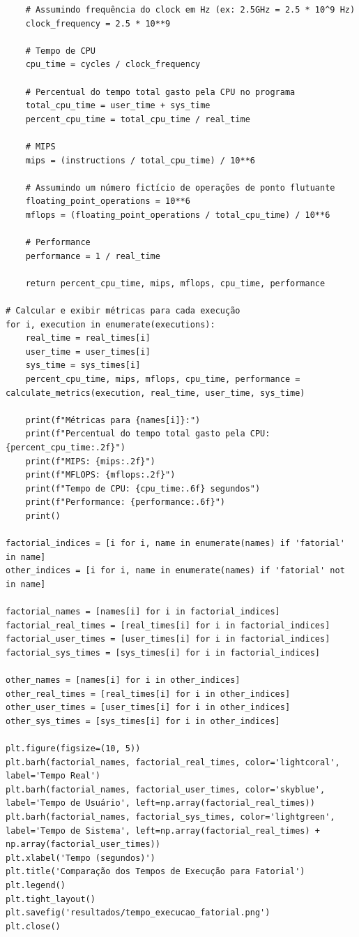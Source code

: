 \documentclass[12pt]{article}
\begin{document}
\begin{verbatim}
    # Assumindo frequência do clock em Hz (ex: 2.5GHz = 2.5 * 10^9 Hz)
    clock_frequency = 2.5 * 10**9 
    
    # Tempo de CPU
    cpu_time = cycles / clock_frequency

    # Percentual do tempo total gasto pela CPU no programa
    total_cpu_time = user_time + sys_time
    percent_cpu_time = total_cpu_time / real_time

    # MIPS
    mips = (instructions / total_cpu_time) / 10**6

    # Assumindo um número fictício de operações de ponto flutuante
    floating_point_operations = 10**6 
    mflops = (floating_point_operations / total_cpu_time) / 10**6

    # Performance
    performance = 1 / real_time

    return percent_cpu_time, mips, mflops, cpu_time, performance

# Calcular e exibir métricas para cada execução
for i, execution in enumerate(executions):
    real_time = real_times[i]
    user_time = user_times[i]
    sys_time = sys_times[i]
    percent_cpu_time, mips, mflops, cpu_time, performance = calculate_metrics(execution, real_time, user_time, sys_time)

    print(f"Métricas para {names[i]}:")
    print(f"Percentual do tempo total gasto pela CPU: {percent_cpu_time:.2f}")
    print(f"MIPS: {mips:.2f}")
    print(f"MFLOPS: {mflops:.2f}")
    print(f"Tempo de CPU: {cpu_time:.6f} segundos")
    print(f"Performance: {performance:.6f}")
    print()

factorial_indices = [i for i, name in enumerate(names) if 'fatorial' in name]
other_indices = [i for i, name in enumerate(names) if 'fatorial' not in name]

factorial_names = [names[i] for i in factorial_indices]
factorial_real_times = [real_times[i] for i in factorial_indices]
factorial_user_times = [user_times[i] for i in factorial_indices]
factorial_sys_times = [sys_times[i] for i in factorial_indices]

other_names = [names[i] for i in other_indices]
other_real_times = [real_times[i] for i in other_indices]
other_user_times = [user_times[i] for i in other_indices]
other_sys_times = [sys_times[i] for i in other_indices]

plt.figure(figsize=(10, 5))
plt.barh(factorial_names, factorial_real_times, color='lightcoral', label='Tempo Real')
plt.barh(factorial_names, factorial_user_times, color='skyblue', label='Tempo de Usuário', left=np.array(factorial_real_times))
plt.barh(factorial_names, factorial_sys_times, color='lightgreen', label='Tempo de Sistema', left=np.array(factorial_real_times) + np.array(factorial_user_times))
plt.xlabel('Tempo (segundos)')
plt.title('Comparação dos Tempos de Execução para Fatorial')
plt.legend()
plt.tight_layout()
plt.savefig('resultados/tempo_execucao_fatorial.png')
plt.close()


\end{verbatim}
\end{document}
